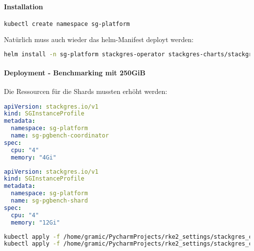 \paragraph{Installation}
\lstset{style=gra_codestyle}
\begin{lstlisting}[language=bash, caption=StackGres-Citus - Namespace 250GiB,captionpos=b,label={lst:stackgres-citus-namespace-250gib},breaklines=true]
kubectl create namespace sg-platform
\end{lstlisting}

Natürlich muss auch wieder das \gls{helm}-Manifest deployt werden:
\lstset{style=gra_codestyle}
\begin{lstlisting}[language=bash, caption=StackGres-Citus - Installation  250GiB,captionpos=b,label={lst:stackgres_citus-values-apply-250gib},breaklines=true]
helm install -n sg-platform stackgres-operator stackgres-charts/stackgres-operator -f /home/gramic/PycharmProjects/rke2_settings/stackgres_citus/stackgres_citus/values.yaml
\end{lstlisting}
\paragraph{Deployment - Benchmarking mit 250GiB}
Die Ressourcen für die Shards mussten erhöht werden:
\lstset{style=gra_codestyle}
\begin{lstlisting}[language=yaml, caption=StackGres-Citus - Benchmarking - SGInstanceProfile Coordinator 250GiB,captionpos=b,label={lst:SGInstanceProfile_pgbench_coord.yaml-250gib},breaklines=true]
apiVersion: stackgres.io/v1
kind: SGInstanceProfile
metadata:
  namespace: sg-platform
  name: sg-pgbench-coordinator
spec:
  cpu: "4"
  memory: "4Gi"
\end{lstlisting}
\lstset{style=gra_codestyle}
\begin{lstlisting}[language=yaml, caption=StackGres-Citus - Benchmarking - SGInstanceProfile Shard 250GiB,captionpos=b,label={lst:SGInstanceProfile_pgbench_shard.yaml-250gib},breaklines=true]
apiVersion: stackgres.io/v1
kind: SGInstanceProfile
metadata:
  namespace: sg-platform
  name: sg-pgbench-shard
spec:
  cpu: "4"
  memory: "12Gi"
\end{lstlisting}

\lstset{style=gra_codestyle}
\begin{lstlisting}[language=bash, caption=StackGres-Citus - Benchmarking - Instanz-Profil Deploy 250GiB,captionpos=b,label={lst:stackgres_citus-deploy-benchmarking-instance-profiles-250gib},breaklines=true]
kubectl apply -f /home/gramic/PycharmProjects/rke2_settings/stackgres_citus/stackgres_citus/SGInstanceProfile_pgbench_coord.yaml
kubectl apply -f /home/gramic/PycharmProjects/rke2_settings/stackgres_citus/stackgres_citus/SGInstanceProfile_pgbench_shard.yaml
\end{lstlisting}

